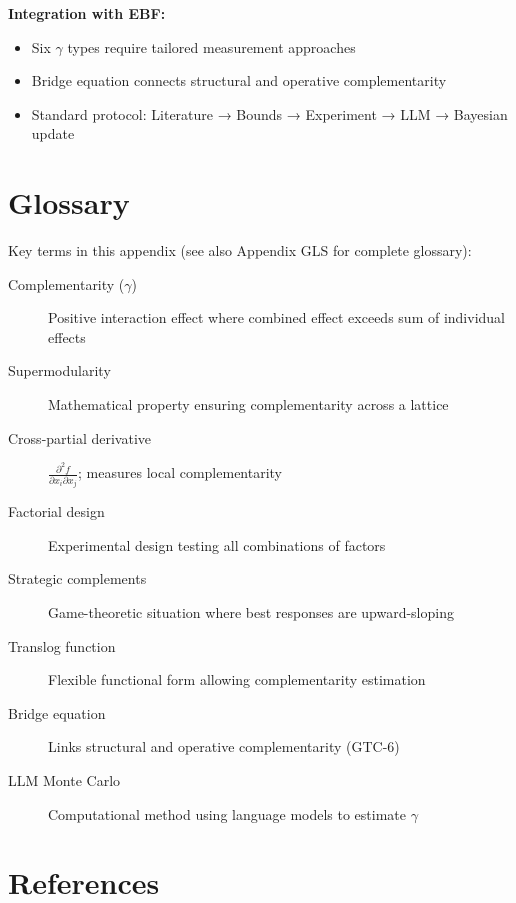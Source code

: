 \begin{tcolorbox}[colback=gray!5!white,colframe=gray!75!black,title=\textbf{Summary: Complementarity Measurement Methodology}]
\textbf{Integration with EBF:}
\begin{itemize}[noitemsep]
    \item Six $\gamma$ types require tailored measurement approaches
    \item Bridge equation connects structural and operative complementarity
    \item Standard protocol: Literature → Bounds → Experiment → LLM → Bayesian update
\end{itemize}

\end{tcolorbox}

\section{Glossary}
\label{sec:glossary}

Key terms in this appendix (see also Appendix GLS for complete glossary):

\begin{description}
    \item[Complementarity ($\gamma$)] Positive interaction effect where combined effect exceeds sum of individual effects
    \item[Supermodularity] Mathematical property ensuring complementarity across a lattice
    \item[Cross-partial derivative] $\frac{\partial^2 f}{\partial x_i \partial x_j}$; measures local complementarity
    \item[Factorial design] Experimental design testing all combinations of factors
    \item[Strategic complements] Game-theoretic situation where best responses are upward-sloping
    \item[Translog function] Flexible functional form allowing complementarity estimation
    \item[Bridge equation] Links structural and operative complementarity (GTC-6)
    \item[LLM Monte Carlo] Computational method using language models to estimate $\gamma$
\end{description}

\section{References}
\label{sec:references}

